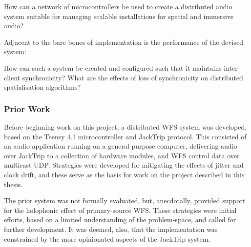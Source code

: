 \begin{researchq}
    \label{rq:rq1}
    How can a network of microcontrollers be used to create a distributed
    audio system suitable for managing scalable installations for spatial
    and immersive audio?
\end{researchq}

\noindent
Adjacent to the bare bones of implementation is the performance of the devised
system:

\begin{researchq}
    \label{rq:rq2}
    How can such a system be created and configured such that it maintains
    inter-client synchronicity? What are the effects of loss of
    synchronicity on distributed spatialisation algorithms?
\end{researchq}


\subsubsection{Prior Work}

Before beginning work on this project, a distributed WFS system was
developed, based on the Teensy 4.1 microcontroller and JackTrip protocol.
This consisted of an audio application running on a general purpose computer,
delivering audio over JackTrip to a collection of hardware modules, and
WFS control data over multicast UDP.
Strategies were developed for mitigating the effects of jitter and clock drift,
and these serve as the basis for work on the project described in this thesis.

The prior system was not formally evaluated, but, anecdotally, provided
support for the holophonic effect of primary-source WFS.
These strategies were initial efforts, based on a limited understanding
of the problem-space, and called for further development.
It was deemed, also, that the implementation was constrained by the more
opinionated aspects of the JackTrip system.
